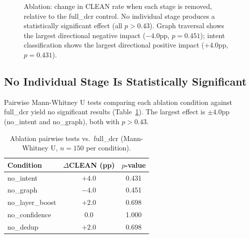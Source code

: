 \documentclass[11pt,a4paper]{article}
\begin{document}
\begin{figure}[t]
\centering
{}
\caption{Ablation: change in CLEAN rate when each stage is removed, relative to the full\_dcr control. No individual stage produces a statistically significant effect (all $p > 0.43$). Graph traversal shows the largest directional negative impact ($-4.0$pp, $p = 0.451$); intent classification shows the largest directional positive impact ($+4.0$pp, $p = 0.431$).}
\label{fig:ablation}
\end{figure}

\subsection{No Individual Stage Is Statistically Significant}

Pairwise Mann-Whitney U tests comparing each ablation condition against full\_dcr yield no significant results (Table~\ref{tab:ablation-pvals}). The largest effect is $\pm 4.0$pp (no\_intent and no\_graph), both with $p > 0.43$.

\begin{table}[t]
\centering
\caption{Ablation pairwise tests vs.\ full\_dcr (Mann-Whitney U, $n = 150$ per condition).}
\label{tab:ablation-pvals}
\begin{tabular}{@{}lcc@{}}
\toprule
Condition & $\Delta$CLEAN (pp) & $p$-value \\
\midrule
no\_intent & $+4.0$ & 0.431 \\
no\_graph & $-4.0$ & 0.451 \\
no\_layer\_boost & $+2.0$ & 0.698 \\
no\_confidence & $0.0$ & 1.000 \\
no\_dedup & $+2.0$ & 0.698 \\
\bottomrule
\end{tabular}
\end{table}
\end{document}
